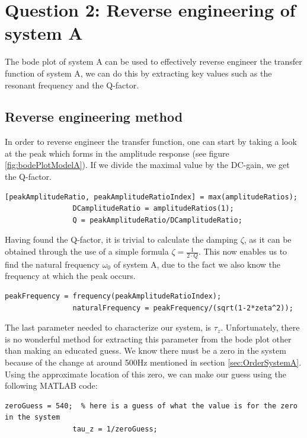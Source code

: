 \documentclass[a4paper,kul]{kulakarticle} %
\begin{document}
	\newpage
	\section{Question 2: Reverse engineering of system A}
		The bode plot of system A can be used to effectively reverse engineer the transfer function of system A, we can do this by extracting key values such as the resonant frequency and the Q-factor. 
		
		\subsection{Reverse engineering method}
			In order to reverse engineer the transfer function, one can start by taking a look at the peak which forms in the amplitude response (see figure \ref{fig:bodePlotModelA}). If we divide the maximal value by the DC-gain, we get the Q-factor. 
			
			\begin{lstlisting}[style=Matlab-editor]
				[peakAmplitudeRatio, peakAmplitudeRatioIndex] = max(amplitudeRatios);
				DCamplitudeRatio = amplitudeRatios(1);
				Q = peakAmplitudeRatio/DCamplitudeRatio;
			\end{lstlisting}
			
			Having found the Q-factor, it is trivial to calculate the damping $\zeta$, as it can be obtained through the use of a simple formula $\zeta = \frac{1}{2\cdot Q}$. This now enables us to find the natural frequency $\omega_0$ of system A, due to the fact we also know the frequency at which the peak occurs. 
			
			\begin{lstlisting}[style=Matlab-editor]
				peakFrequency = frequency(peakAmplitudeRatioIndex);
				naturalFrequency = peakFrequency/(sqrt(1-2*zeta^2));
			\end{lstlisting}
			
			The last parameter needed to characterize our system, is $\tau_z$.  Unfortunately, there is no wonderful method for extracting this parameter from the bode plot other than making an educated guess.  We know there must be a zero in the system because of the change at around 500Hz mentioned in section \ref{sec:OrderSystemA}.  Using the approximate location of this zero, we can make our guess using the following MATLAB code:
			
			\begin{lstlisting}[style=Matlab-editor]
				zeroGuess = 540;  % here is a guess of what the value is for the zero in the system
				tau_z = 1/zeroGuess;
			\end{lstlisting}
			
\end{document}
